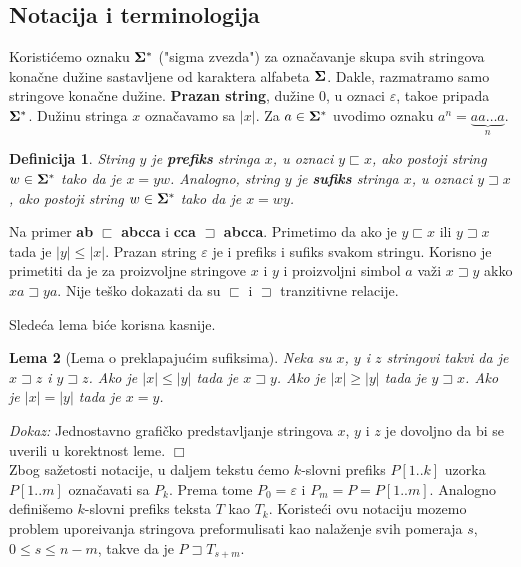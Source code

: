 \documentclass[a4paper,12pt]{article}
\newtheorem{dfn}{Definicija}[section]
\newtheorem{lm}[dfn]{Lema}
\begin{document}
\subsection{Notacija i terminologija}

Koristi\' cemo oznaku $\bf \Sigma^\ast$ ("sigma zvezda") za ozna\v cavanje skupa svih stringova kona\v cne du\v zine sastavljene od karaktera alfabeta $\bf \Sigma$. Dakle, razmatramo samo stringove kona\v cne du\v zine. {\bf Prazan string}, du\v zine $0$, u oznaci $\varepsilon$, tako\dj e pripada $\bf \Sigma^\ast$. Du\v zinu stringa $x$ ozna\v cavamo sa $|x|$. Za $a \in {\bf \Sigma^\ast}$ uvodimo oznaku $a^n = \underbrace{aa\ldots a}_{n}$.

\begin{dfn}

String $y$ je {\bf prefiks} stringa $x$, u oznaci $y \sqsubset x$, ako postoji string $w \in {\bf \Sigma^\ast}$ tako da je $x = yw$. Analogno, string $y$ je {\bf sufiks} stringa $x$, u oznaci $y \sqsupset x$, ako postoji string $w \in {\bf \Sigma^\ast}$ tako da je $x = wy$.

\end{dfn}

Na primer {\bf ab} $\sqsubset$ {\bf abcca} i {\bf cca} $\sqsupset$ {\bf abcca}. Primetimo da ako je $y \sqsubset x$ ili $y \sqsupset x$ tada je $|y| \leq |x|$. Prazan string $\varepsilon$ je i prefiks i sufiks svakom stringu. Korisno je primetiti da je za proizvoljne stringove $x$ i $y$ i proizvoljni simbol $a$ va\v zi $x \sqsupset y$ akko $xa \sqsupset ya$. Nije te\v sko dokazati da su $\sqsubset$ i $\sqsupset$ tranzitivne relacije.

Slede\' ca lema bi\' ce korisna kasnije.

\begin{lm}[Lema o preklapaju\' cim sufiksima]

Neka su $x$, $y$ i $z$ stringovi takvi da je $x \sqsupset z$ i $y \sqsupset z$. Ako je $|x| \leq |y|$ tada je $x \sqsupset y$. Ako je $|x| \geq |y|$ tada je $y \sqsupset x$. Ako je $|x| = |y|$ tada je $x = y$.

\end{lm}
\textit{Dokaz:} Jednostavno grafi\v cko predstavljanje stringova $x$, $y$ i $z$ je dovoljno da bi se uverili u korektnost leme. $\Box$
\\

Zbog sa\v zetosti notacije, u daljem tekstu \' cemo $k$-slovni prefiks $P[1..k]$ uzorka $P[1..m]$ ozna\v cavati sa $P_k$. Prema tome $P_0 = \varepsilon$ i $P_m = P = P[1..m]$. Analogno defini\v semo $k$-slovni prefiks teksta $T$ kao $T_k$. Koriste\' ci ovu notaciju mozemo problem upore\dj ivanja stringova preformulisati kao nala\v zenje svih pomeraja $s$, $0 \leq s \leq n - m$, takve da je $P \sqsupset T_{s+m}$.
\\
\end{document}
